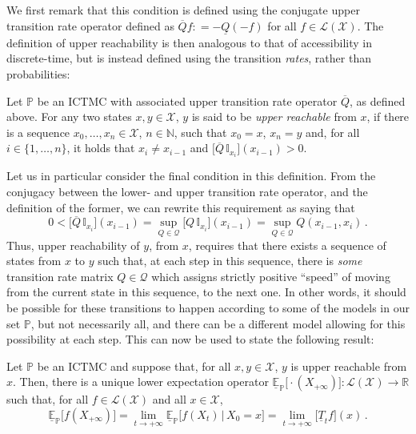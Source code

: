 \documentclass[graybox]{svmult}
\newcommand{\nats}{\mathbb{N}}
\newcommand{\reals}{\mathbb{R}}
\newcommand{\states}{\mathcal{X}}
\newcommand{\gambles}{\mathcal{L}}
\newcommand{\gamblesX}{\gambles(\states)}
\newcommand{\coloneqq}{:\!=}
\begin{document}
We first remark that this condition is defined using the conjugate upper transition rate operator defined as $\overline{Q}f\coloneqq -\underline{Q}(-f)$ for all $f\in\gamblesX$. The definition of upper reachability is then analogous to that of accessibility in discrete-time, but is instead defined using the transition \emph{rates}, rather than probabilities:
\begin{definition}
Let $\mathbb{P}$ be an ICTMC with associated upper transition rate operator $\overline{Q}$, as defined above. For any two states $x,y\in\states$, $y$ is said to be \emph{upper reachable} from $x$, if there is a sequence $x_0,\ldots,x_n\in\states$, $n\in\nats$, such that $x_0=x$, $x_n=y$ and, for all $i\in\{1,\ldots,n\}$, it holds that $x_{i}\neq x_{i-1}$ and $\bigl[\overline{Q}\,\mathbb{I}_{x_i}\bigr](x_{i-1})>0$.
\end{definition}
Let us in particular consider the final condition in this definition. From the conjugacy between the lower- and upper transition rate operator, and the definition of the former, we can rewrite this requirement as saying that
\begin{equation*}
0 < \bigl[\overline{Q}\,\mathbb{I}_{x_i}\bigr](x_{i-1}) = \sup_{Q\in\mathcal{Q}} \bigl[Q\,\mathbb{I}_{x_i}\bigr](x_{i-1}) = \sup_{Q\in\mathcal{Q}} Q(x_{i-1},x_i)\,.
\end{equation*}
Thus, upper reachability of $y$, from $x$, requires that there exists a sequence of states from $x$ to $y$ such that, at each step in this sequence, there is \emph{some} transition rate matrix $Q\in\mathcal{Q}$ which assigns strictly positive ``speed'' of moving from the current state in this sequence, to the next one. In other words, it should be possible for these transitions to happen according to some of the models in our set $\mathbb{P}$, but not necessarily all, and there can be a different model allowing for this possibility at each step. This can now be used to state the following result:

\begin{theorem}\label{theo:ictmc_ergodic_simple}
Let $\mathbb{P}$ be an ICTMC and suppose that, for all $x,y\in\states$, $y$ is upper reachable from $x$. Then, there is a unique lower expectation operator $\underline{\mathbb{E}}_\mathbb{P}\bigl[\cdot(X_{+\infty})\bigr]:\gamblesX\to\reals$ such that, for all $f\in\gamblesX$ and all $x\in\states$,
\begin{equation*}
\underline{\mathbb{E}}_\mathbb{P}\bigl[f(X_{+\infty})\bigr] = \lim_{t\to+\infty} \underline{\mathbb{E}}_\mathbb{P}\bigl[f(X_{t})\,\big\vert\,X_0=x\bigr] = \lim_{t\to+\infty}\bigl[\underline{T}_tf\bigr](x)\,.
\end{equation*}
\end{theorem}
\end{document}
